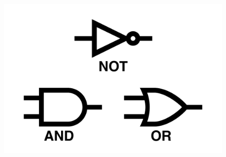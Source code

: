 \begin{frame}
\begin{columns}
		\begin{figure}[!htbp]
			\centering
			\advance\rightskip-0.25cm
			\includegraphics[width=1.0\linewidth]{images/1_i_sistemi/logic_gates_not_and_or.pdf}
		\end{figure}
	\end{columns}
		
		
	
	
	
\end{frame}



